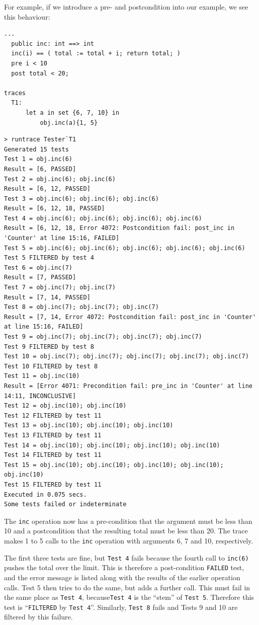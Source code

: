 \documentclass{overturerepchap}
\begin{document}
For example, if we introduce a pre- and postcondition into our example, we see
this behaviour:

\small
\begin{lstlisting}
...
  public inc: int ==> int
  inc(i) == ( total := total + i; return total; )
  pre i < 10
  post total < 20;

traces
  T1:
      let a in set {6, 7, 10} in
          obj.inc(a){1, 5}
\end{lstlisting}

\scriptsize
\lstset{style=tool,language=}
\begin{lstlisting}[escapechar=@]
> runtrace Tester`T1
Generated 15 tests
Test 1 = obj.inc(6)
Result = [6, PASSED]
Test 2 = obj.inc(6); obj.inc(6)
Result = [6, 12, PASSED]
Test 3 = obj.inc(6); obj.inc(6); obj.inc(6)
Result = [6, 12, 18, PASSED]
Test 4 = obj.inc(6); obj.inc(6); obj.inc(6); obj.inc(6)
Result = [6, 12, 18, Error 4072: Postcondition fail: post_inc in 'Counter' at line 15:16, FAILED]
Test 5 = obj.inc(6); obj.inc(6); obj.inc(6); obj.inc(6); obj.inc(6)
Test 5 FILTERED by test 4
Test 6 = obj.inc(7)
Result = [7, PASSED]
Test 7 = obj.inc(7); obj.inc(7)
Result = [7, 14, PASSED]
Test 8 = obj.inc(7); obj.inc(7); obj.inc(7)
Result = [7, 14, Error 4072: Postcondition fail: post_inc in 'Counter' at line 15:16, FAILED]
Test 9 = obj.inc(7); obj.inc(7); obj.inc(7); obj.inc(7)
Test 9 FILTERED by test 8
Test 10 = obj.inc(7); obj.inc(7); obj.inc(7); obj.inc(7); obj.inc(7)
Test 10 FILTERED by test 8
Test 11 = obj.inc(10)
Result = [Error 4071: Precondition fail: pre_inc in 'Counter' at line 14:11, INCONCLUSIVE]
Test 12 = obj.inc(10); obj.inc(10)
Test 12 FILTERED by test 11
Test 13 = obj.inc(10); obj.inc(10); obj.inc(10)
Test 13 FILTERED by test 11
Test 14 = obj.inc(10); obj.inc(10); obj.inc(10); obj.inc(10)
Test 14 FILTERED by test 11
Test 15 = obj.inc(10); obj.inc(10); obj.inc(10); obj.inc(10); obj.inc(10)
Test 15 FILTERED by test 11
Executed in 0.075 secs. 
Some tests failed or indeterminate
\end{lstlisting}
\lstset{style=mystyle}
\lstset{language=VDM++}
\normalsize

\noindent The \texttt{inc} operation now has a pre-condition that the argument must be
less than 10 and a postcondition that the resulting total must be less than 20.
The trace makes 1 to 5 calls to the \texttt{inc} operation with arguments 6, 7
and 10, respectively.

The first three tests are fine, but \texttt{Test 4} fails because the fourth call to
\texttt{inc(6)} pushes the total over the limit. This is therefore a
post-condition \texttt{FAILED} test, and the error message is listed along with the
results of the earlier operation calls. Test 5 then tries to do the same, but
adds a further call. This must fail in the same place as \texttt{Test 4}, because\texttt{Test 4}
is the ``stem'' of \texttt{Test 5}. Therefore this test is ``\texttt{FILTERED} by \texttt{Test 4}''.
Similarly, \texttt{Test 8} fails and Tests 9 and 10 are filtered by this failure.
\end{document}
